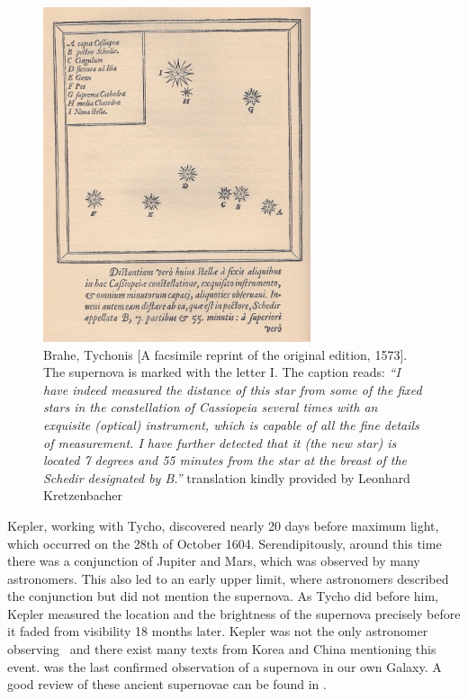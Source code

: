 \begin{figure}[tb] %
   \centering
   \includegraphics[width=0.7\textwidth]{chapter_intro/plots/Tycho_Cas_SN1572.jpg} 
   \caption[Star chart of SN 1572 by Tycho Brahe]{Brahe, Tychonis [A facsimile reprint of the original edition, 1573]. The supernova is marked with the letter I. The caption reads: \textit{``I have indeed measured the distance of this star from some of the fixed stars in the constellation of Cassiopeia several times with an exquisite (optical) instrument, which is capable of all the fine details of measurement. I have further detected that it (the new star) is located 7 degrees and 55 minutes from the star at the breast of the Schedir designated by B.''} translation kindly provided by Leonhard Kretzenbacher}
   \label{fig:sn1572_tycho_chart}
\end{figure}

Kepler, working with Tycho, discovered  nearly 20 days before maximum light, which occurred on the 28th of October 1604. Serendipitously, around this time there was a conjunction of Jupiter and Mars, which was observed by many astronomers. This also led to an early upper limit, where astronomers described the conjunction but did not mention the supernova. As Tycho did before him, Kepler measured the location and the brightness of the supernova precisely \citep[see Figure \ref{fig:sn1604_ancient_lc};][]{kepler1606} before it faded from visibility 18 months later. Kepler was not the only astronomer observing \ and there exist many texts from Korea and China mentioning this event.  was the last confirmed observation of a supernova in our own Galaxy. A good review of these ancient supernovae can be found in \citet{2003LNP...598....7G}.

